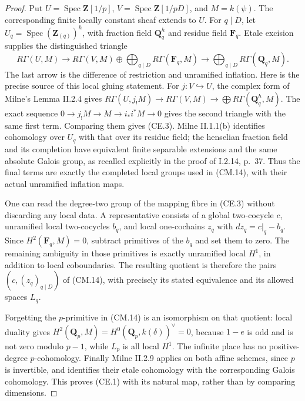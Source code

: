 \begin{proof}
Put \(U=\operatorname{Spec}\mathbf Z[1/p]\),
\(V=\operatorname{Spec}\mathbf Z[1/pD]\), and \(M=k(\psi)\).
The corresponding finite locally constant sheaf extends to \(U\).
For \(q\mid D\), let \(U_q=\operatorname{Spec}(\mathbf Z_{(q)})^h\),
with fraction field \(\mathbf Q_q^h\) and residue field \(\mathbf F_q\).
Etale excision supplies the distinguished triangle
\[
 R\Gamma(U,M)\longrightarrow
 R\Gamma(V,M)\oplus\bigoplus_{q\mid D}R\Gamma(\mathbf F_q,M)
 \longrightarrow\bigoplus_{q\mid D}R\Gamma(\mathbf Q_q,M).
                                                        \tag{CE.3}
\]
The last arrow is the difference of restriction and unramified
inflation.  Here is the precise source of this local gluing statement.
For \(j:V\hookrightarrow U\), the complex form of Milne's
Lemma II.2.4 gives
\(R\Gamma(U,j_!M)\to R\Gamma(V,M)\to
\bigoplus R\Gamma(\mathbf Q_q^h,M)\).
The exact sequence \(0\to j_!M\to M\to i_*i^*M\to0\)
gives the second triangle with the same first term.
Comparing them gives (CE.3).
Milne II.1.1(b) identifies cohomology over \(U_q\) with that over
its residue field; the henselian fraction field and its completion
have equivalent finite separable extensions and the same absolute
Galois group, as recalled explicitly in the proof of I.2.14, p.~37.
Thus the final terms are exactly the completed local groups used
in (CM.14), with their actual unramified inflation maps.

One can read the degree-two group of the mapping fibre in (CE.3)
without discarding any local data.  A representative consists of
a global two-cocycle \(c\), unramified local two-cocycles \(b_q\),
and local one-cochains \(z_q\) with
\(dz_q=c|_q-b_q\).
Since \(H^2(\mathbf F_q,M)=0\), subtract primitives of the \(b_q\)
and set them to zero.  The remaining ambiguity in those primitives
is exactly unramified local \(H^1\), in addition to local
coboundaries.  The resulting quotient is therefore the pairs
\((c,(z_q)_{q\mid D})\) of (CM.14), with precisely its stated
equivalence and its allowed spaces \(L_q\).

Forgetting the \(p\)-primitive in (CM.14) is an isomorphism on
that quotient: local duality gives
\(H^2(\mathbf Q_p,M)=H^0(\mathbf Q_p,k(\delta))^\vee=0\),
because \(1-e\) is odd and is not zero modulo \(p-1\), while
\(L_p\) is all local \(H^1\).  The infinite place has no
positive-degree \(p\)-cohomology.  Finally Milne II.2.9 applies
on both affine schemes, since \(p\) is invertible, and identifies
their etale cohomology with the corresponding Galois cohomology.
This proves (CE.1) with its natural map, rather than by comparing
dimensions.


\end{proof}
